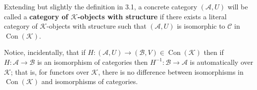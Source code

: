 Extending but slightly the definition in 3.1, a concrete category $(\mathcal{A}, U)$ will be called a \textbf{category of $\mathcal{K}$-objects with structure} if there exists a literal category of $\mathcal{K}$-objects with structure such that $(\mathcal{A}, U)$ is isomorphic to $\mathcal{C}$ in $\operatorname{Con}(\mathcal{K})$.

Notice, incidentally, that if $H: (\mathcal{A}, U) \to (\mathcal{B}, V) \in \operatorname{Con}(\mathcal{K})$ then if $H: \mathcal{A} \to \mathcal{B}$ is an isomorphism of categories then $H^{-1}: \mathcal{B} \to \mathcal{A}$ is automatically over $\mathcal{K}$; that is, for functors over $\mathcal{K}$, there is no difference between isomorphisms in $\operatorname{Con}(\mathcal{K})$ and isomorphisms of categories.
